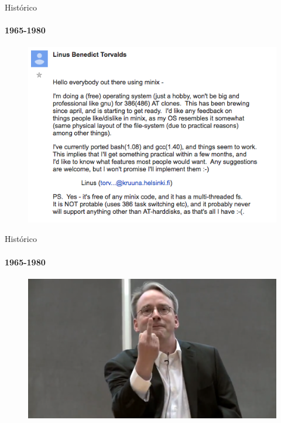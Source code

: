 \documentclass{beamer}
\begin{document}
\begin{frame}{Histórico}
	\framesubtitle{1965-1980}
	\begin{figure}
		\includegraphics[width=0.7\paperwidth]{resources/linusemail}
	\end{figure}
\end{frame}
\begin{frame}{Histórico}
	\framesubtitle{1965-1980}
	\begin{figure}
		\includegraphics[width=0.7\paperwidth]{resources/linus2}
	\end{figure}
\end{frame}
\end{document}
